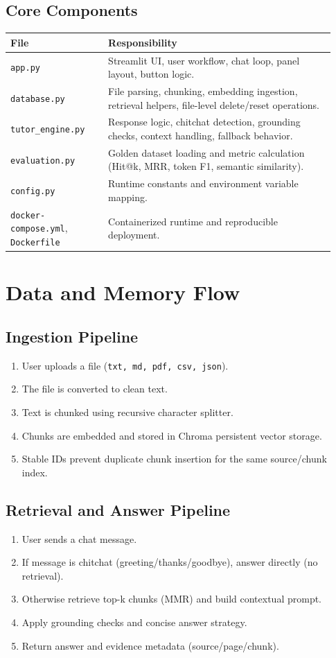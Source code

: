 \documentclass[11pt,a4paper]{article}
\begin{document}
\subsection{Core Components}
\begin{longtable}{|p{0.28\linewidth}|p{0.65\linewidth}|}
\hline
\textbf{File} & \textbf{Responsibility} \\
\hline
\texttt{app.py} & Streamlit UI, user workflow, chat loop, panel layout, button logic. \\
\hline
\texttt{database.py} & File parsing, chunking, embedding ingestion, retrieval helpers, file-level delete/reset operations. \\
\hline
\texttt{tutor_engine.py} & Response logic, chitchat detection, grounding checks, context handling, fallback behavior. \\
\hline
\texttt{evaluation.py} & Golden dataset loading and metric calculation (Hit@k, MRR, token F1, semantic similarity). \\
\hline
\texttt{config.py} & Runtime constants and environment variable mapping. \\
\hline
\texttt{docker-compose.yml}, \texttt{Dockerfile} & Containerized runtime and reproducible deployment. \\
\hline
\end{longtable}

\section{Data and Memory Flow}
\subsection{Ingestion Pipeline}
\begin{enumerate}[leftmargin=*]
\item User uploads a file (\texttt{txt, md, pdf, csv, json}).
\item The file is converted to clean text.
\item Text is chunked using recursive character splitter.
\item Chunks are embedded and stored in Chroma persistent vector storage.
\item Stable IDs prevent duplicate chunk insertion for the same source/chunk index.
\end{enumerate}

\subsection{Retrieval and Answer Pipeline}
\begin{enumerate}[leftmargin=*]
\item User sends a chat message.
\item If message is chitchat (greeting/thanks/goodbye), answer directly (no retrieval).
\item Otherwise retrieve top-k chunks (MMR) and build contextual prompt.
\item Apply grounding checks and concise answer strategy.
\item Return answer and evidence metadata (source/page/chunk).
\end{enumerate}
\end{document}

